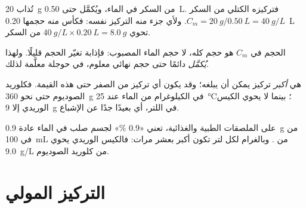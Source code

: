 \begin{example}\label{ex:g10:concentration-and-dilution:sugar}
تُذاب \qty{20}{g} من السكر في الماء، ويُكمَّل  حتى
\qty{0.50}{L}. فتركيزه الكتلي من السكر
$C_m = \qty{20}{g} / \qty{0.50}{L} = \qty{40}{g/L}$. ولأي جزء منه التركيز
نفسه: فكأس منه حجمها \qty{0.20}{L} تحوي
$\qty{40}{g/L} \times \qty{0.20}{L} = \qty{8.0}{g}$ من السكر.
\end{example}


\begin{remark}\label{rem:g10:concentration-and-dilution:volume}
الحجم في $C_m$ هو حجم  كله، لا حجم الماء المصبوب: فإذابة  تغيّر
الحجم قليلًا. ولهذا \emph{يُكمَّل}  دائمًا حتى حجم نهائي معلوم، في
حوجلة معلَّمة لذلك.
\end{remark}

\begin{remark}\label{rem:g10:concentration-and-dilution:not-solubility}
  هي \emph{أكبر} تركيز يمكن أن يبلغه؛ وقد يكون  أي تركيز
من الصفر حتى هذه القيمة. فكلوريد الصوديوم  حتى نحو \qty{360}{g} في
الكيلوغرام من الماء عند \qty{25}{\celsius}؛ بينما لا يحوي الكيس الوريدي إلا
\qty{9}{g} في اللتر، أي بعيدًا جدًا عن الإشباع.
\end{remark}

\begin{remark}\label{rem:g10:concentration-and-dilution:percent}
على الملصقات الطبية والغذائية، تعني «0.9 \%» لجسم صلب  في الماء عادة
\qty{0.9}{g} من  في \qty{100}{mL} من . وبالغرام لكل لتر تكون
أكبر بعشر مرات: فالكيس الوريدي يحوي \qty{9.0}{g/L} من كلوريد
الصوديوم.
\end{remark}

\section{التركيز المولي}

